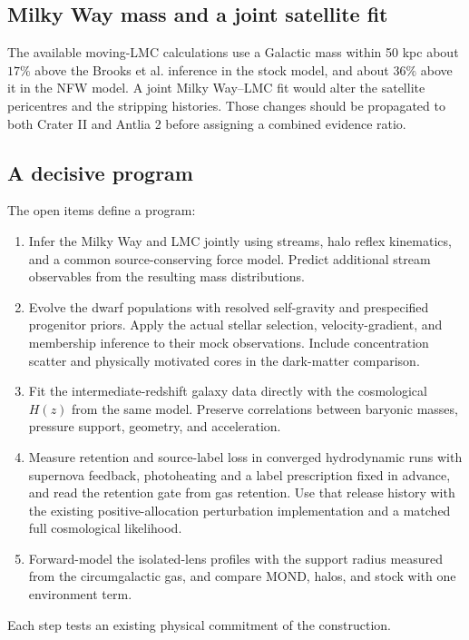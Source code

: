 \subsection{Milky Way mass and a joint satellite fit}
\label{sec:jointtest}
The available
moving-LMC calculations use a Galactic mass within 50 kpc about $17\%$
above the Brooks et al. inference in the stock model, and about $36\%$
above it in the NFW model. A joint Milky Way--LMC fit would alter the
satellite pericentres and the stripping histories. Those changes should
be propagated to both Crater II and Antlia 2 before assigning a combined
evidence ratio. \cite{brooks}

\subsection{A decisive program}
The open items define a program:
\begin{enumerate}
\item Infer the Milky Way and LMC jointly using streams, halo reflex
kinematics, and a common source-conserving force model. Predict additional
stream observables from the resulting mass distributions.
\item Evolve the dwarf populations with resolved self-gravity and
prespecified progenitor priors. Apply the actual stellar selection,
velocity-gradient, and membership inference to their mock observations.
Include concentration scatter and physically motivated cores in the
dark-matter comparison.
\item Fit the intermediate-redshift galaxy data directly with the
cosmological $H(z)$ from the same model. Preserve correlations between
baryonic masses, pressure support, geometry, and acceleration.
\item Measure retention and source-label loss in converged hydrodynamic
runs with supernova feedback, photoheating and a label prescription fixed
in advance, and read the retention gate from gas retention. Use that release history
with the existing positive-allocation perturbation implementation and
a matched full cosmological likelihood.
\item Forward-model the isolated-lens profiles with the support radius
measured from the circumgalactic gas, and compare MOND, halos, and stock
with one environment term.
\end{enumerate}
Each step tests an existing physical commitment of the construction.

